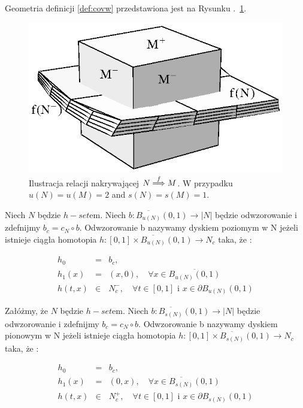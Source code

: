 Geometria definicji  \ref{def:covw} przedstawiona jest na 
Rysunku .~\ref{fig:cover}.

\begin{figure}[htbp]
\centerline{
    \includegraphics[width=.5\textwidth]{cover.eps}
    }
\caption{Ilustracja relacji nakrywającej $N\stackrel{f}{\Longrightarrow}M$. W przypadku $u(N)=u(M)=2$ and $s(N)=s(M)=1$.\label{fig:cover}}
\end{figure}

\begin{definition}\label{def:horizontalDisk}
Niech $N$ będzie $h-set$em. Niech $ b:\overline{B_{u(N)}}(0,1) \to |N| $
będzie odwzorowanie i zdefnijmy $b_c = c_N \circ b$. Odwzorowanie b nazywamy dyskiem poziomym w N jeżeli istnieje ciągła homotopia $ h: [0,1] \times \overline{B_{u(N)}}(0,1) \to
N_c $ taka, że :
	
\begin{eqnarray*}
    h_0&=&b_c, \\
    h_1(x)&=&(x,0),\quad \forall x \in \overline{B_{u(N)}(0,1)}\\
    h(t,x)&\in &N^-_c,\quad \forall t \in [0,1] \mbox{ i } x \in \partial B_{u(N)}(0,1)
\end{eqnarray*}
\end{definition}

\begin{definition}\label{def:verticalDisk}
Załóżmy, że $N$ będzie $h-set$em. Niech $ b:\overline{B_{s(N)}}(0,1) \to |N| $
będzie odwzorowanie i zdefnijmy $b_c = c_N \circ b$. Odwzorowanie b nazywamy dyskiem pionowym w N jeżeli istnieje ciągła homotopia $ h: [0,1] \times \overline{B_{s(N)}}(0,1) \to
N_c $ taka, że :
	
\begin{eqnarray*}
    h_0&=&b_c, \\
    h_1(x)&=&(0,x),\quad \forall x \in \overline{B_{s(N)}}(0,1)\\
    h(t,x)&\in &N^+_c,\quad \forall t \in [0,1] \mbox{ i } x \in \partial B_{s(N)}(0,1)
\end{eqnarray*}
\end{definition}

